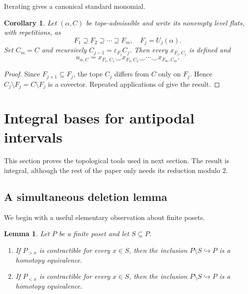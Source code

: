 \documentclass[10pt]{amsart}
\theoremstyle{plain}
\newtheorem{lemma}[theorem]{Lemma}
\newtheorem{corollary}[theorem]{Corollary}
\theoremstyle{definition}
\newcommand{\eps}{\varepsilon}
\begin{document}
Iterating gives a canonical standard monomial.

\begin{corollary}\label{standard-factorization}
Let $(\alpha,C)$ be tope-admissible and write its nonempty level flats, with repetitions, as
\[
F_1\supseteq F_2\supseteq\cdots\supseteq F_m,\quad F_j=U_j(\alpha).
\]
Set $C_m=C$ and recursively $C_{j-1}=\eps_{F_j}C_j$. Then every $x_{F_j,C_j}$ is defined and
\begin{equation}\label{standard-factorization-eq}
u_{\alpha,C}=x_{F_1,C_1}\smile x_{F_2,C_2}\smile\cdots \smile x_{F_m,C_m}.
\end{equation}
\end{corollary}

\begin{proof}
Since $F_{j+1}\subseteq F_j$, the tope $C_j$ differs from $C$ only on $F_j$. Hence $C_j\setminus F_j=C\setminus F_j$ is a covector. Repeated applications of  give the result.
\end{proof}




\section{Integral bases for antipodal intervals}\label{integral-basis}

This section proves the topological tools used in next section. The result is integral, although the rest of the paper only needs its reduction modulo $2$.

\subsection{A simultaneous deletion lemma}

We begin with a useful elementary observation about finite posets.

\begin{lemma}\label{simultaneous-deletion}
Let $P$ be a finite poset and let $S\subseteq P$.
\begin{enumerate}[label=\textup{(\roman*)}]
\item If $P_{>x}$ is contractible for every $x\in S$, then the inclusion $P\setminus S\hookrightarrow P$ is a homotopy equivalence.
\item If $P_{<x}$ is contractible for every $x\in S$, then the inclusion $P\setminus S\hookrightarrow P$ is a homotopy equivalence.
\end{enumerate}
\end{lemma}
\end{document}
